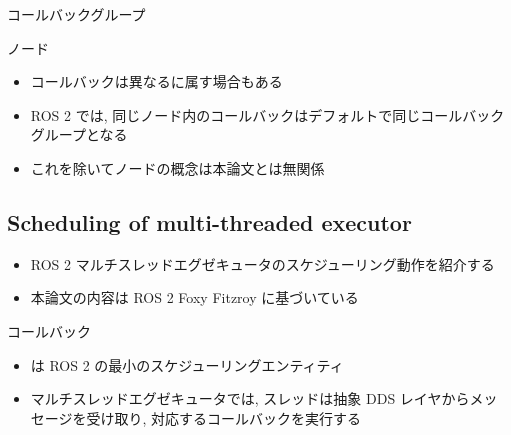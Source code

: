 \begin{frame}{コールバックグループ}

\end{frame}

\begin{frame}{ノード}
    \begin{itemize}
        \item コールバックは異なるに属す場合もある
        \item ROS 2 では, 同じノード内のコールバックはデフォルトで同じコールバックグループとなる
        \item これを除いてノードの概念は本論文とは無関係
    \end{itemize}

\end{frame}


\subsection{Scheduling of multi-threaded executor}
\label{ssec: scheduling_of_multi_threaded_executor}

\begin{frame}{}
    \begin{itemize}
        \item ROS 2 マルチスレッドエグゼキュータのスケジューリング動作を紹介する
        \item 本論文の内容は ROS 2 Foxy Fitzroy に基づいている
    \end{itemize}

\end{frame}

\begin{frame}{コールバック}
    \begin{itemize}
        \item {}は ROS 2 の最小のスケジューリングエンティティ
        \item マルチスレッドエグゼキュータでは, スレッドは抽象 DDS レイヤからメッセージを受け取り, 対応するコールバックを実行する
    \end{itemize}
\end{frame}


